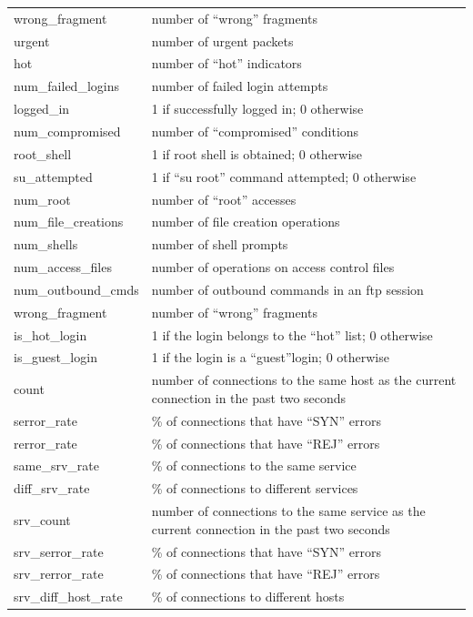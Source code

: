 \documentclass[a4paper,10pt]{article}
\begin{document}
\begin{itemize}
\begin{center}
\begin{longtable}{|l|l|}
wrong\_fragment 
& number of ``wrong'' fragments \\
urgent 
& number of urgent packets \\
hot 
& number of ``hot'' indicators \\
num\_failed\_logins 
& number of failed login attempts  \\
logged\_in 
& 1 if successfully logged in; 0 otherwise  \\
num\_compromised 
& number of ``compromised'' conditions  \\
root\_shell 
& 1 if root shell is obtained; 0 otherwise  \\
su\_attempted 
& 1 if ``su root'' command attempted; 0 otherwise  \\
num\_root 
& number of ``root'' accesses  \\
num\_file\_creations 
& number of file creation operations  \\
num\_shells 
& number of shell prompts  \\
num\_access\_files 
& number of operations on access control files  \\
num\_outbound\_cmds
& number of outbound commands in an ftp session  \\
wrong\_fragment 
& number of ``wrong'' fragments \\
is\_hot\_login 
& 1 if the login belongs to the ``hot'' list; 0 otherwise \\
is\_guest\_login 
& 1 if the login is a ``guest''login; 0 otherwise \\
count 
& number of connections to the same host as the current connection in the past two seconds \\
serror\_rate 
& \% of connections that have ``SYN'' errors \\
rerror\_rate 
& \% of connections that have ``REJ'' errors \\
same\_srv\_rate 
& \% of connections to the same service \\
diff\_srv\_rate 
& \% of connections to different services \\
srv\_count 
& number of connections to the same service as the current connection in the past two seconds \\
srv\_serror\_rate 
& \% of connections that have ``SYN'' errors \\
srv\_rerror\_rate 
& \% of connections that have ``REJ'' errors \\
srv\_diff\_host\_rate 
& \% of connections to different hosts \\

\hline

\end{longtable}
\label{tabla:sencilla}
\end{center}



\end{itemize}
\end{document}
